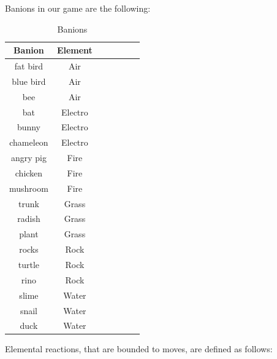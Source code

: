 \documentclass[12pt, a4paper]{report}
\begin{document}
    Banions in our game are the following:

\begin{table}[ht]
    \begin{center}
    \begin{tabular}{| c | c | c | c | c | c | c |}
        \hline
        Banion & Element \\ [0.5ex] %
        \hline\hline
        fat bird & Air \\
        \hline
        blue bird & Air \\
        \hline
        bee & Air \\
        \hline
        bat & Electro \\
        \hline
        bunny & Electro \\
        \hline
        chameleon & Electro \\
        \hline
        angry pig & Fire \\
        \hline
        chicken & Fire \\
        \hline
        mushroom & Fire \\
        \hline
        trunk & Grass \\
        \hline
        radish & Grass \\
        \hline
        plant & Grass \\
        \hline
        rocks & Rock \\
        \hline
        turtle & Rock \\
        \hline
        rino & Rock \\
        \hline
        slime & Water \\
        \hline
        snail & Water \\
        \hline
        duck & Water \\
        \hline
    \end{tabular}
    \caption{\label{table:banions} Banions}
    \end{center}
\end{table}

    Elemental reactions, that are bounded to moves, are defined as follows:
\end{document}
